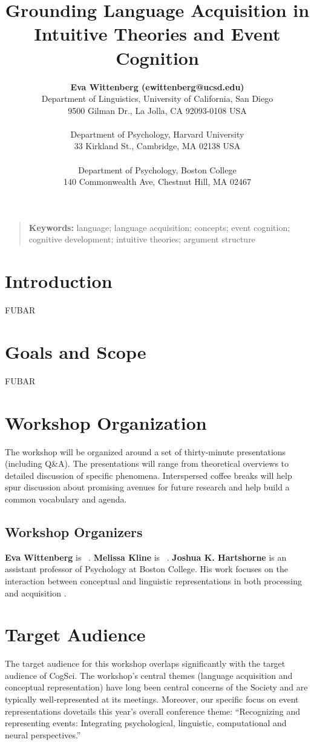 \documentclass[10pt,letterpaper]{article}
\title{Grounding Language Acquisition in Intuitive Theories and Event Cognition}
\author{{\large \bf Eva Wittenberg (ewittenberg@ucsd.edu)} \\
  Department of Linguistics,
  University of California, San Diego \\
  9500 Gilman Dr.,
  La Jolla, CA 92093-0108 USA \\
  \AND {\large \bf Melissa Kline (mekline@mit.edu)} \\
  Department of Psychology,
  Harvard University \\
  33 Kirkland St.,
  Cambridge, MA 02138 USA \\
  \AND {\large \bf Joshua K. Hartshorne (joshua.hartshorne@bc.edu)} \\
  Department of Psychology,
  Boston College \\
  140 Commonwealth Ave,
  Chestnut Hill, MA 02467}
\newcommand{\jtodo}[2][]
{\todo[caption={#2}, size=\small, #1, color = orange, inline]{\renewcommand{\baselinestretch}{1}\selectfont \textbf{JH}: #2}~}
\begin{document}
\maketitle

\begin{quote}
\small
\textbf{Keywords:}
language; language acquisition; concepts; event cognition; cognitive
development; intuitive theories; argument structure
\end{quote}

\section{Introduction}



FUBAR

\section{Goals and Scope}

FUBAR

\section{Workshop Organization}

\noindent The workshop will be organized around a set of thirty-minute
presentations (including Q\&A). The presentations will range from
theoretical overviews to detailed discussion of specific
phenomena. Interspersed coffee breaks will help spur discussion about
promising avenues for future research and help build a common
vocabulary and agenda.

\subsection{Workshop Organizers}

\textbf{Eva Wittenberg} is \jtodo{Please blurb}. \textbf{Melissa Kline} is
\jtodo{please blurb}. \textbf{Joshua K. Hartshorne} is an assistant professor of
Psychology at Boston College. His work focuses on the interaction
between conceptual and linguistic representations in both processing
and acquisition \cite{HOSULS,HOT2015}.

\section{Target Audience}

\noindent The target audience for this workshop overlaps significantly
with the target audience of CogSci. The workshop's central themes
(language acquisition and conceptual representation) have long been
central concerns of the Society and are typically well-represented at
its meetings. Moreover, our specific focus on event representations
dovetails this year's overall conference theme: ``Recognizing and
representing events: Integrating psychological, linguistic,
computational and neural perspectives.''
\end{document}
